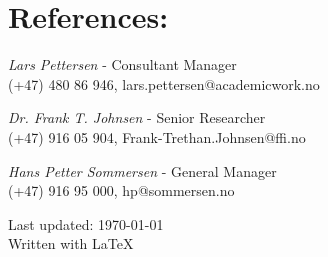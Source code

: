 \documentclass[letterpaper]{article}
\def\footerlink{}
\renewenvironment{itemize}{
  \begin{list}{}{
    \setlength{\leftmargin}{1.2em}
  }
}{
  \end{list}
}
\begin{document}
\section*{References:}
\begin{itemize}
    \item[Academic Work :] \textit{Lars Pettersen} - Consultant Manager 
	\\(+47) 480 86 946, lars.pettersen@academicwork.no

    \item[FFI :] \textit{Dr. Frank T. Johnsen} - Senior Researcher
	\\(+47)  916 05 904, Frank-Trethan.Johnsen@ffi.no

    \item[iNic :] \textit{Hans Petter Sommersen} - General Manager
	\\(+47) 916 95 000, hp@sommersen.no

\end{itemize}


\bigskip

\begin{center}
  \begin{footnotesize}
    Last updated: \today \\
    \href{\footerlink}{\texttt{\footerlink}} Written with \LaTeX
  \end{footnotesize}
\end{center}
\end{document}
